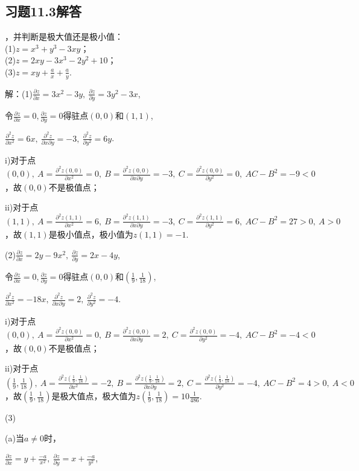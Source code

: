 \documentclass[12pt,UTF8]{ctexart}
\begin{document}
\subsection{习题11.3解答}
\begin{enumerate}
，并判断是极大值还是极小值：\\
(1)$z=x^3+y^3-3xy$；\\
(2)$z=2xy-3x^3-2y^2+10$；\\
(3)$z=xy+\frac ax+\frac ay$.

解：(1)$\frac{\partial z}{\partial x}=3x^2-3y,\ \frac{\partial z}{\partial y}=3y^2-3x$,

令$\frac{\partial z}{\partial x}=0,\frac{\partial z}{\partial y}=0$得驻点$(0,0)$和$(1,1)$,

$\frac{\partial^2z}{\partial x^2}=6x,\ \frac{\partial^2z}{\partial x\partial y}=-3,\ \frac{\partial^2z}{\partial y^2}=6y$.

i)对于点$(0,0),\ A=\frac{\partial^2z(0,0)}{\partial x^2}=0,\ B=\frac{\partial^2z(0,0)}{\partial x\partial y}=-3,\ C=\frac{\partial^2z(0,0)}{\partial y^2}=0,\ AC-B^2=-9<0$，故$(0,0)$不是极值点；

ii)对于点$(1,1),\ A=\frac{\partial^2z(1,1)}{\partial x^2}=6,\ B=\frac{\partial^2z(1,1)}{\partial x\partial y}=-3,\ C=\frac{\partial^2z(1,1)}{\partial y^2}=6,\ AC-B^2=27>0,\ A>0$，故$(1,1)$是极小值点，极小值为$z(1,1)=-1$.

(2)$\frac{\partial z}{\partial x}=2y-9x^2,\ \frac{\partial z}{\partial y}=2x-4y$,

令$\frac{\partial z}{\partial x}=0,\frac{\partial z}{\partial y}=0$得驻点$(0,0)$和$(\frac19,\frac1{18})$,

$\frac{\partial^2z}{\partial x^2}=-18x,\ \frac{\partial^2z}{\partial x\partial y}=2,\ \frac{\partial^2z}{\partial y^2}=-4$.

i)对于点$(0,0),\ A=\frac{\partial^2z(0,0)}{\partial x^2}=0,\ B=\frac{\partial^2z(0,0)}{\partial x\partial y}=2,\ C=\frac{\partial^2z(0,0)}{\partial y^2}=-4,\ AC-B^2=-4<0$，故$(0,0)$不是极值点；

ii)对于点$(\frac19,\frac1{18}),\ A=\frac{\partial^2z(\frac19,\frac1{18})}{\partial x^2}=-2,\ B=\frac{\partial^2z(\frac19,\frac1{18})}{\partial x\partial y}=2,\ C=\frac{\partial^2z(\frac19,\frac1{18})}{\partial y^2}=-4,\ AC-B^2=4>0,\ A<0$，故$(\frac19,\frac1{18})$是极大值点，极大值为$z(\frac19,\frac1{18})=10\frac1{486}$.

(3)

(a)当$a\neq0$时，

$\frac{\partial z}{\partial x}=y+\frac{-a}{x^2},\ \frac{\partial z}{\partial y}=x+\frac{-a}{y^2}$,


\end{enumerate}
\end{document}
